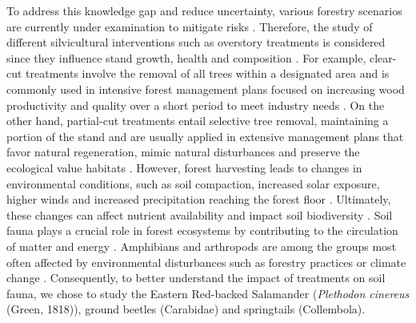 To address this knowledge gap and reduce uncertainty, various forestry scenarios are currently under examination to mitigate risks \citep{royoDesiredREgenerationAssisted2023}. 
Therefore, the study of different silvicultural interventions such as overstory treatments is considered since they influence stand growth, health and composition \citep{Ameray2021Forestcarbon,Chaudhary2016Impactforest,Man2008Elevenyearresponses,MontoroGirona2018ConiferRegeneration,PamerleauCouture2015Effectthree}. 
For example, clear-cut treatments involve the removal of all trees within a designated area and is commonly used in intensive forest management plans focused on increasing wood productivity and quality over a short period to meet industry needs \citep{Ameray2021Forestcarbon}. 
On the other hand, partial-cut treatments entail selective tree removal, maintaining a portion of the stand and are usually applied in extensive management plans that favor natural regeneration, mimic natural disturbances and preserve the ecological value habitats \citep{Ameray2021Forestcarbon,Barg1999Influencepartial,Irland2011Timberproductivity,Tong2020Forestmanagement}. 
However, forest harvesting leads to changes in environmental conditions, such as soil compaction, increased solar exposure, higher winds and increased precipitation reaching the forest floor \citep{Keenan1993ecologicaleffects,Lindo2003Microbialbiomass,Heithecker2007Edgerelatedgradients}. 
Ultimately, these changes can affect nutrient availability and impact soil biodiversity \citep{Battigelli2004Shorttermimpact,Chaudhary2016Impactforest,Covington1981Changesforest,Fedrowitz2014Canretention,Kudrin2023metaanalysiseffects,Lindo2003Microbialbiomass,Paillet2010Biodiversitydifferences,rousseauLongtermEffectsBiomass2018}.
Soil fauna plays a crucial role in forest ecosystems by contributing to the circulation of matter and energy \citep{Kudrin2023metaanalysiseffects,Seibold2021contributioninsects}. 
Amphibians and arthropods are among the groups most often affected by environmental disturbances such as forestry practices \citep{Hartshorn2021reviewforest,Semlitsch2009Effectstimber,Stuart2004Statustrends} or climate change \citep{Alford1999Globalamphibian,Houlahan2000Quantitativeevidence,Milanovich2010Projectedloss,Parmesan2006EcologicalEvolutionary,Pounds2006Widespreadamphibian,Warren2018projectedeffect}.
Consequently, to better understand the impact of  treatments on soil fauna, we chose to study the Eastern Red-backed Salamander (\textit{Plethodon cinereus} (Green, 1818)), ground beetles (Carabidae) and springtails (Collembola).

